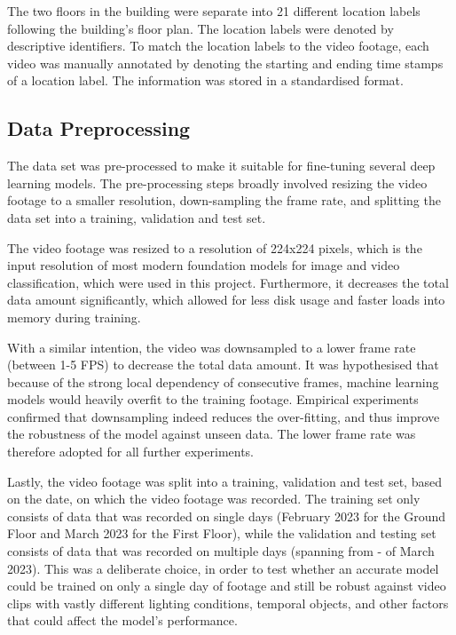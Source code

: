 \documentclass{article}
\begin{document}
  The two floors in the building were separate into 21 different location labels
  following the building's floor plan. The location labels were denoted by
  descriptive identifiers. To match the location labels to the video footage,
  each video was manually annotated by denoting the starting and ending time
  stamps of a location label. The information was stored in a standardised
  format.



  \subsection{Data Preprocessing} %
  \label{sub:data-preprocessing}

  The data set was pre-processed to make it suitable for fine-tuning several deep
  learning models. The pre-processing steps broadly involved resizing the video
  footage to a smaller resolution, down-sampling the frame rate, and splitting
  the data set into a training, validation and test set.

  The video footage was resized to a resolution of 224x224 pixels, which is the
  input resolution of most modern foundation models for image and video
  classification, which were used in this project. Furthermore, it decreases the 
  total data amount significantly, which allowed for less disk usage and faster
  loads into memory during training.

  With a similar intention, the video was downsampled to a lower frame rate
  (between 1-5 FPS) to decrease the total data amount. It was hypothesised that
  because of the strong local dependency of consecutive frames, machine learning
  models would heavily overfit to the training footage. Empirical experiments
  confirmed that downsampling indeed reduces the over-fitting, and thus improve
  the robustness of the model against unseen data. The lower frame rate was
  therefore adopted for all further experiments.

  Lastly, the video footage was split into a training, validation and test set,
  based on the date, on which the video footage was recorded. The training set
  only consists of data that was recorded on single days (February  2023
  for the Ground Floor and March  2023 for the First Floor), while the
  validation and testing set consists of data that was recorded on multiple days
  (spanning from - of March 2023). This was a deliberate choice,
  in order to test whether an accurate model could be trained on only a single
  day of footage and still be robust against video clips with vastly different
  lighting conditions, temporal objects, and other factors that could affect the
  model's performance.
\end{document}
